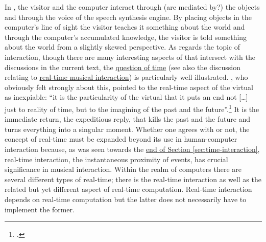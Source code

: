 In , the visitor and the computer interact through (are mediated by?) the objects and through the voice of the speech synthesis engine. By placing objects in the computer's line of sight the visitor teaches it something about the world and through the computer's accumulated knowledge, the visitor is told something about the world from a slightly skewed perspective. As regards the topic of interaction, though there are many interesting aspects of  that intersect with the discussions in the current text, the \hyperref[sec:interaction-time]{question of time} (see also the discussion relating to \hyperlink{sec:human-comp-inter:7}{real-time musical interaction}) is particularly well illustrated. \citeauthor{baudrillard02}, who obviously felt strongly about this, pointed to the real-time aspect of the virtual as inexpiable: ``it is the particularity of the virtual that it puts an end not [\ldots] just to reality of time, but to the imagining of the past and the future''.\footcite[107]{baudrillard02} It is the immediate return, the expeditious reply, that kills the past and the future and turns everything into a singular moment. Whether one agrees with \citeauthor{baudrillard02} or not, the concept of real-time must be expanded beyond its use in human-computer interaction because, as was seen towards the \hyperlink{par:human-comp-inter:8}{end of Section \ref*{sec:time-interaction}}, real-time interaction, the instantaneous proximity of events, has crucial significance in musical interaction. Within the realm of computers there are several different types of real-time; there is the real-time interaction as well as the related but yet different aspect of real-time computation. Real-time interaction depends on real-time computation but the latter does not necessarily have to implement the former. 

